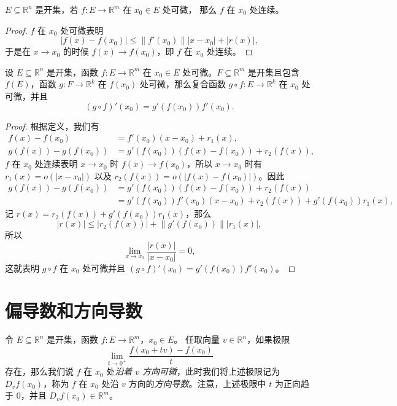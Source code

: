\documentclass[fontset=none,zihao=-4]{Notes}
\newcommand{\norm}[1]{\left\lVert#1\right\rVert}
\newcommand{\abs}[1]{\left\lvert#1\right\rvert}
\begin{document}
\begin{proposition}
  $E\subseteq\mathbb{R}^n$ 是开集，若 $f:E\to\mathbb{R}^m$ 在 $x_0\in E$ 处可微，
  那么 $f$ 在 $x_0$ 处连续。
\end{proposition}
\begin{proof}
  $f$ 在 $x_0$ 处可微表明
  \[
    \abs{f(x)-f(x_0)}\leq \norm{f'(x_0)}\abs{x-x_0}+\abs{r(x)},  
  \]
  于是在 $x\to x_0$ 的时候 $f(x)\to f(x_0)$，即 $f$ 在 $x_0$ 处连续。
\end{proof}

\begin{theorem}[链式法则]
  设 $E\subseteq\mathbb{R}^n$ 是开集，函数 $f:E\to\mathbb{R}^m$ 在 $x_0\in E$
  处可微。$F\subseteq\mathbb{R}^m$ 是开集且包含 $f(E)$，函数 $g:F\to\mathbb{R}^k$
  在 $f(x_0)$ 处可微，那么复合函数 $g\circ f:E\to\mathbb{R}^k$ 在 $x_0$ 处可微，并且
  \[
    (g\circ f)'(x_0)=g'(f(x_0)) f'(x_0).  
  \]
\end{theorem}
\begin{proof}
  根据定义，我们有
  \begin{align*}
    f(x)-f(x_0)&=f'(x_0)(x-x_0)+r_1(x),\\
    g(f(x))-g(f(x_0))&=g'(f(x_0))(f(x)-f(x_0))+r_2(f(x)),
  \end{align*}
  $f$ 在 $x_0$ 处连续表明 $x\to x_0$ 时 $f(x)\to f(x_0)$，所以 $x\to x_0$ 时有
  $r_1(x)=o(|x-x_0|)$ 以及 $r_2(f(x))=o(\abs{f(x)-f(x_0)})$。因此
  \begin{align*}
    g(f(x))-g(f(x_0))&=g'(f(x_0))(f(x)-f(x_0))+r_2(f(x))\\
    &=g'(f(x_0))f'(x_0)(x-x_0)+r_2(f(x))+g'(f(x_0))r_1(x),
  \end{align*}
  记 $r(x)=r_2(f(x))+g'(f(x_0))r_1(x)$，那么
  \[
    \abs{r(x)}\leq\abs{r_2(f(x))}+\norm{g'(f(x_0))}\abs{r_1(x)},
  \]
  所以
  \[
    \lim_{x\to x_0}\frac{\abs{r(x)}}{\abs{x-x_0}}=0,  
  \]
  这就表明 $g\circ f$ 在 $x_0$ 处可微并且 $(g\circ f)'(x_0)=g'(f(x_0)) f'(x_0)$。
\end{proof}

\section{偏导数和方向导数}

令 $E\subseteq\mathbb{R}^n$ 是开集，函数 $f:E\to\mathbb{R}^m$，$x_0\in E$。
任取向量 $v\in\mathbb{R}^n$，如果极限
\[
  \lim_{t\to 0^+}\frac{f(x_0+tv)-f(x_0)}{t}  
\]
存在，那么我们说 $f$ 在 $x_0$ 处\emph{沿着 $v$ 方向可微}，此时我们将上述极限记为
$D_vf(x_0)$，称为 $f$ 在 $x_0$ 处沿 $v$ 方向的\emph{方向导数}。注意，上述极限中 $t$ 为正向趋于 $0$，并且 $D_vf(x_0)\in\mathbb{R}^m$。
\end{document}
